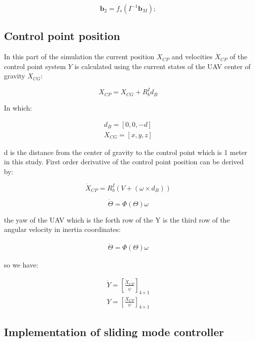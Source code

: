 \begin{equation}
	\textbf{b}_2= f_s(I^{-1} \textbf{b}_M);
\end{equation}

\subsection{Control point position}
In this part of the simulation the current position $X_{CP}$ and velocities $\dot{X}_{CP}$ of the control point system $Y$ is calculated using the current states of the UAV center of gravity $X_{CG}$:

\begin{equation}
	X_{CP}=X_{CG}+R_b^Id_B
\end{equation}

In which:

\begin{align}
	d_B=[0,0,-d] \\
	X_{CG}=[x,y,z]
\end{align}

d is the distance from the center of gravity to the control point which is 1 meter in this study. First order derivative of the control point position can be derived by:

\begin{equation}
	\dot{X}_{CP}=R_b^I(V+(\omega \times d_B))
\end{equation}

\begin{equation}
	\dot{\Theta}=\Phi(\Theta)\omega 
\end{equation}

the yaw of the UAV which is the forth row of the Y is the third row of the angular velocity in inertia coordinates:

\begin{align}
	\dot{\Theta}=\Phi(\Theta)\omega
\end{align}

so we have:

\begin{align} \label{Y_sliding}
	\dot{Y}=[\frac{\dot{X}_{CP}}{\dot{\psi}}]_{4\times 1}\\
	Y=[\frac{X_{CP}}{\psi}]_{4\times 1}
\end{align}

\subsection{Implementation of sliding mode controller}

